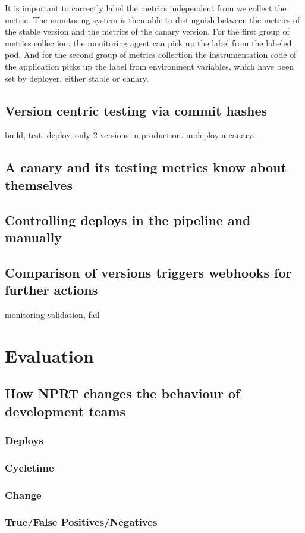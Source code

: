 It is important to correctly label the metrics independent from we collect the metric. The
monitoring system is then able to distinguish between the metrics of the stable version
and the metrics of the canary version. For the first group of metrics collection, the
monitoring agent can pick up the label from the labeled pod. And for the second group of
metrics collection the instrumentation code of the application picks up the label from
environment variables, which have been set by deployer, either stable or canary.

\section{Version centric testing via commit hashes}
build, test, deploy, only 2 versions in production. undeploy a canary.
\section{A canary and its testing metrics know about themselves}
\section{Controlling deploys in the pipeline and manually}
\section{Comparison of versions triggers webhooks for further actions}
monitoring validation, fail

\chapter{Evaluation}
\section{How NPRT changes the behaviour of development teams}
\subsection{Deploys}
\subsection{Cycletime}
\subsection{Change}
\subsection{True/False Positives/Negatives}
